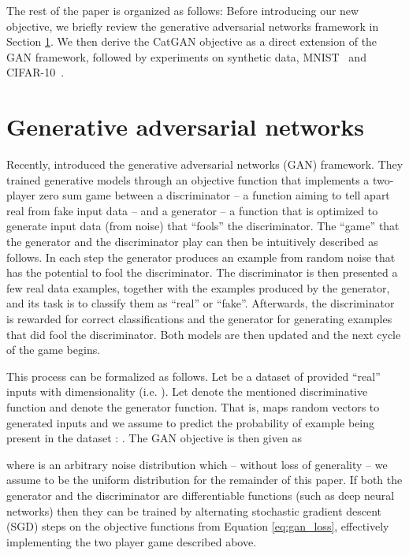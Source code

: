 \documentclass{article} \usepackage{iclr2016_conference,times}
\newcommand{\TODO}[2][JTS]{}
\begin{document}
The rest of the paper is organized as follows: Before introducing our
new objective, we briefly review the generative adversarial networks
framework in Section \ref{sect:gan}. We then derive the CatGAN
objective as a direct extension of the GAN framework, followed by
experiments on synthetic data, MNIST~\citep{LeCun_NC1989} and
CIFAR-10~\citep{Krizhevsky2009}.

\TODO{I currently interchangeably use samples and examples, I should
  really change notation to be consistent! }

\TODO{Also check and make uses of category vs. class consistent.}

\TODO{unsupervisedly ?}

\section{Generative adversarial networks}
\label{sect:gan}
Recently, \citet{Goodfellow_NIPS2014} introduced the generative adversarial
networks (GAN) framework. They trained generative models through an
objective function that implements a two-player zero sum game between
a discriminator  -- a function aiming to tell apart real from fake
input data -- and a generator  -- a function that is optimized to generate
input data (from noise) that ``fools'' the discriminator. The ``game''
that the generator and the discriminator play can then be intuitively
described as follows. In each step the generator produces an
example from random noise that has the potential to fool the
discriminator. The discriminator is then presented a few real data
examples, together with the examples produced by the generator, and
its task is to classify them as ``real'' or ``fake''. Afterwards, the
discriminator is rewarded for correct classifications and the generator
for generating examples that did fool the discriminator. Both
models are then updated and the next cycle of the game begins.


This process can be formalized as follows. Let  be a dataset of provided ``real'' inputs
with dimensionality  (i.e. ). Let
 denote the mentioned discriminative function and  denote the
generator function. That is,  maps random vectors  to generated inputs  and we assume
 to predict the probability of example  being present in the
dataset : . The GAN objective is then given as

where  is an arbitrary noise distribution which -- without loss of
generality -- we assume to be the uniform distribution  for the remainder of this paper. If both the generator
and the discriminator are differentiable functions (such as deep neural
networks) then they can be trained by alternating stochastic
gradient descent (SGD) steps on the objective functions from Equation
\eqref{eq:gan_loss}, effectively implementing the two player game
described above.
\end{document}

